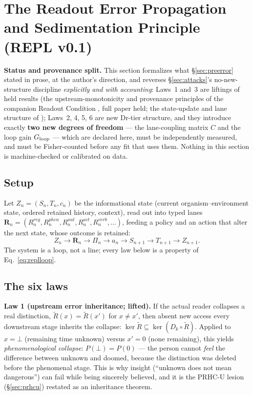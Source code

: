\documentclass[9pt,twocolumn]{article}
\begin{document}
\section{The Readout Error Propagation and Sedimentation Principle (REPL v0.1)}
\label{sec:repl}
\textbf{Status and provenance split.} This section formalizes what \S\ref{sec:preerror} stated in prose, at the author's direction, and reverses \S\ref{sec:attacks}'s no-new-structure discipline \emph{explicitly and with accounting}: Laws~1 and~3 are liftings of held results (the upstream-monotonicity and provenance principles of the companion Readout Condition \cite{lahtee2026rc}, full paper held; the state-update and lane structure of \cite{lahtee2026genesis}); Laws~2, 4, 5, 6 are new Dr-tier structure, and they introduce exactly \textbf{two new degrees of freedom} --- the lane-coupling matrix $C$ and the loop gain $G_{\rm loop}$ --- which are declared here, must be independently measured, and must be Fisher-counted before any fit that uses them. Nothing in this section is machine-checked or calibrated on data.

\subsection{Setup}
Let $Z_n=(S_n,T_n,c_n)$ be the informational state (current organism--environment state, ordered retained history, context), read out into typed lanes $\mathbf R_n=(R^{reg}_n,R^{phen}_n,R^{aut}_n,R^{act}_n,R^{verb}_n,\dots)$, feeding a policy and an action that alter the next state, whose outcome is retained:
\begin{equation}
Z_n\to\mathbf R_n\to\Pi_n\to a_n\to S_{n+1}\to T_{n+1}\to Z_{n+1}.
\label{eq:replloop}
\end{equation}
The system is a loop, not a line; every law below is a property of Eq.~\ref{eq:replloop}.

\subsection{The six laws}
\textbf{Law 1 (upstream error inheritance; lifted).} If the actual reader collapses a real distinction, $\tilde R(x)=\tilde R(x')$ for $x\neq x'$, then absent new access every downstream stage inherits the collapse: $\ker\tilde R\subseteq\ker(D_k\circ\tilde R)$. Applied to $x=\bot$ (remaining time unknown) versus $x'=0$ (none remaining), this yields \emph{phenomenological collapse}: $P(\bot)=P(0)$ --- the person cannot \emph{feel} the difference between unknown and doomed, because the distinction was deleted before the phenomenal stage. This is why insight (``unknown does not mean dangerous'') can fail while being sincerely believed, and it is the PRHC-U lesion (\S\ref{sec:prhcu}) restated as an inheritance theorem.
\end{document}
